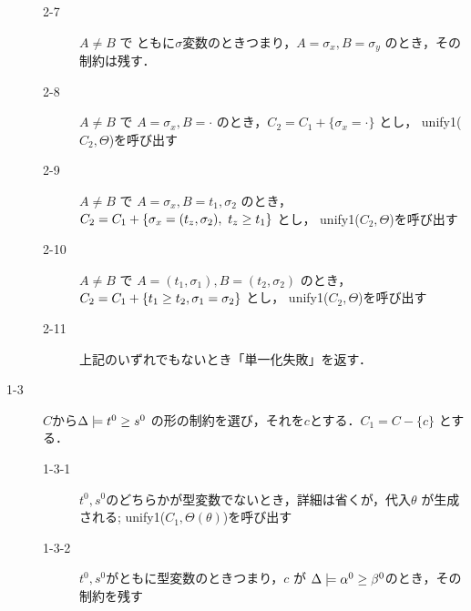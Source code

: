 \begin{oframed}
\begin{description}
\begin{description}
    \item[2-7] $A \neq B$ で ともに$\sigma$変数のときつまり，$A = \sigma_x , B = \sigma_y$ のとき，その制約は残す．
    \item[2-8] $A \neq B$ で $A = \sigma_x , B = \cdot$ のとき，$C_2 = C_1 + \{\sigma_x = \cdot\}$ とし， unify1($C_2, \Theta$)を呼び出す
    \item[2-9] $A \neq B$ で $A = \sigma_x , B = t_1, \sigma_2$ のとき，$C_2 = C_1 + \{\sigma_x = (t_z,\sigma_2),~ {t_z} \ge {t_1} \}$ とし， unify1($C_2, \Theta$)を呼び出す
    \item[2-10] $A \neq B$ で $A = (t_1, \sigma_1) , B = (t_2, \sigma_2)$ のとき，$C_2 = C_1 + \{{t_1} \ge {t_2}, \sigma_1 = \sigma_2 \}$ とし， unify1($C_2, \Theta$)を呼び出す
    \item[2-11] 上記のいずれでもないとき「単一化失敗」を返す．
    \end{description}
  \item[1-3] $C$から$\Delta \models {t^0} \ge {s^0}$ の形の制約を選び，それを$c$とする．$C_1 = C - \{c\}$ とする．
    \begin{description}
    \item[1-3-1] $t^0,s^0$のどちらかが型変数でないとき，詳細は省くが，代入$\theta$ が生成される;
      unify1($C_1, \Theta(\theta)$)を呼び出す
    \item[1-3-2] $t^0,s^0$がともに型変数のときつまり，$c$ が $\Delta \models {\alpha^0} \ge {\beta^0}$のとき，その制約を残す
    \end{description}
  \end{description}
\end{oframed}




